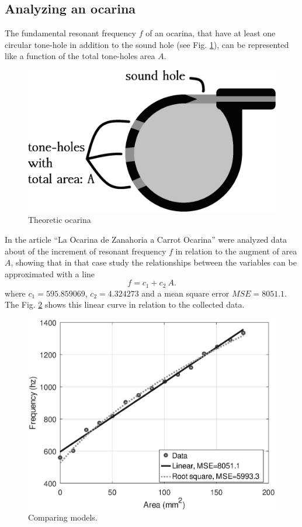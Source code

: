 \documentclass[11pt,twocolumn]{article}
\begin{document}
\subsection{Analyzing an ocarina}
\label{subsec:analyzing}
The fundamental resonant frequency $f$ of an ocarina, 
that have at least one circular tone-hole %
in addition to the sound hole (see Fig. \ref{fig:ocarina-teorica}),
can be represented like a function of the total tone-holes area $A$.


\begin{figure}[ht!]
\centering
\includegraphics[width=0.750\columnwidth]{ocarina-teorica.eps}
\caption{Theoretic ocarina}
\label{fig:ocarina-teorica}
\end{figure}

In the article ``La Ocarina de Zanahoria a Carrot Ocarina'' \cite{mp2010ocarina}
were analyzed data about of the increment of resonant frequency $f$ in relation to the augment of area $A$,
showing that in that case study the relationships between the variables can be approximated with a line 
\begin{equation}
f=c_1+ c_2~A.
\end{equation}
where $c_1=595.859069$, $c_2=4.324273$ and a mean square error $MSE=8051.1$.
The Fig. \ref{fig:models} shows this linear curve in relation to the collected data.


\begin{figure}[ht!]
\centering
\includegraphics[width=0.850\columnwidth]{compara.eps}
\caption{Comparing models. }
\label{fig:models}
\end{figure}
\end{document}
